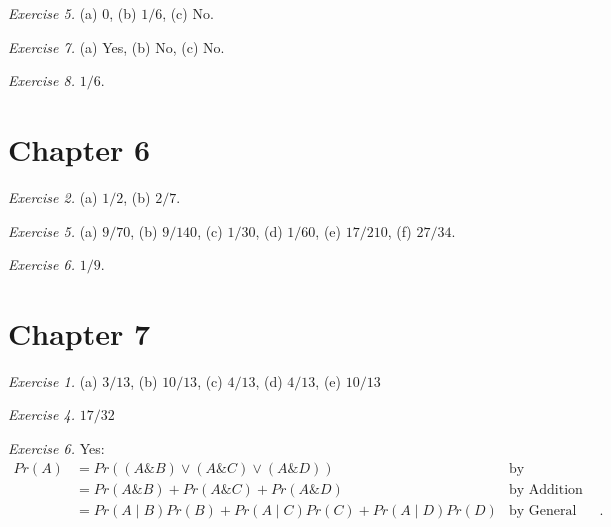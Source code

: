\documentclass[justified]{tufte-book}
\newcommand{\given}{\mid}
\renewcommand{\wedge}{\mathbin{\&}}
\newcommand{\p}{Pr}
\begin{document}
\vspace{.5em}

\noindent
\emph{Exercise 5.} (a) \(0\), (b) \(1/6\), (c) No.

\vspace{.5em}

\noindent
\emph{Exercise 7.} (a) Yes, (b) No, (c) No.

\vspace{.5em}

\noindent
\emph{Exercise 8.} \(1/6\).

\hypertarget{chapter-6}{%
\section*{Chapter 6}\label{chapter-6}}

\noindent
\emph{Exercise 2.} (a) \(1/2\), (b) \(2/7\).

\vspace{.5em}

\noindent
\emph{Exercise 5.} (a) \(9/70\), (b) \(9/140\), (c) \(1/30\), (d) \(1/60\), (e) \(17/210\), (f) \(27/34\).

\vspace{.5em}

\noindent
\emph{Exercise 6.} \(1/9\).

\hypertarget{chapter-7}{%
\section*{Chapter 7}\label{chapter-7}}

\noindent
\emph{Exercise 1.} (a) \(3/13\), (b) \(10/13\), (c) \(4/13\), (d) \(4/13\), (e) \(10/13\)

\vspace{.5em}

\noindent
\emph{Exercise 4.} \(17/32\)

\vspace{.5em}

\noindent
\emph{Exercise 6.} Yes:
\[
  \begin{aligned}
    \p(A) 
    & = \p((A \wedge B) \vee (A \wedge C) \vee (A \wedge D))            & \text{by Equivalence}\\
    & = \p(A \wedge B) + \p(A \wedge C) + \p(A \wedge D)                & \text{by Addition}\\
    & = \p(A \given B)\p(B) + \p(A \given C)\p(C) + \p(A \given D)\p(D) & \text{by General Multiplication}.
  \end{aligned}
  \]
\end{document}

